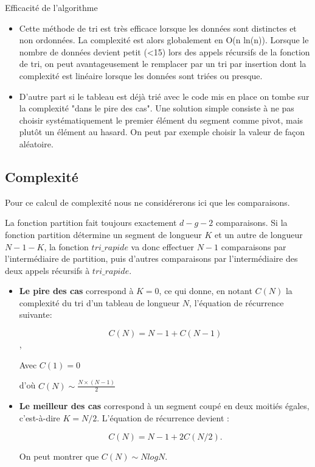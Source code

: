 \begin{prop}{Efficacité de l'algorithme}
\begin{itemize}
\item\cite{Beynet} Cette méthode de tri est très efficace lorsque les données sont distinctes et non ordonnées. La complexité est alors globalement en O(n ln(n)). Lorsque le nombre de données devient petit (<15) lors des appels récursifs de la fonction de tri, on peut avantageusement le remplacer par un tri par insertion dont la complexité est linéaire lorsque les données sont triées ou presque.




\item \cite{wack} D'autre part si le tableau est déjà trié avec le code mis en place on tombe sur la complexité "dans le pire des cas". Une solution simple consiste à ne pas choisir systématiquement
le premier élément du segment comme pivot, mais plutôt un élément au hasard. On peut par exemple choisir la valeur de façon aléatoire.
\end{itemize}
\end{prop}

\subsection{Complexité \cite{wack}}


Pour ce calcul de complexité nous ne considérerons ici que les comparaisons. 

La fonction partition fait toujours exactement $d-g-2$ comparaisons. Si la fonction
partition détermine un segment de longueur $K$ et un autre de longueur $N-1-K$, la fonction
$tri\_rapide$ va donc effectuer $N-1$ comparaisons par l'intermédiaire de partition,
puis d'autres comparaisons par l'intermédiaire des deux appels récursifs à $tri\_rapide$.

\begin{itemize}
\item \textbf{Le pire des cas} correspond à $K = 0$, ce qui donne, en notant $C(N)$ la complexité du tri d'un tableau
de longueur $N$, l'équation de récurrence suivante:

$$C(N) = N-1 + C(N-1)$$,

Avec $C(1)=0$

d'où $C(N) \sim \frac{N\times(N-1)}{2}$

\item \textbf{Le meilleur des cas} correspond à un segment coupé en deux moitiés
égales, c'est-à-dire $K = N/2$. L'équation de récurrence devient : 

$$C(N) = N-1 + 2C(N/2).$$


On peut montrer que $C(N) \sim N log N$.
\end{itemize} 



